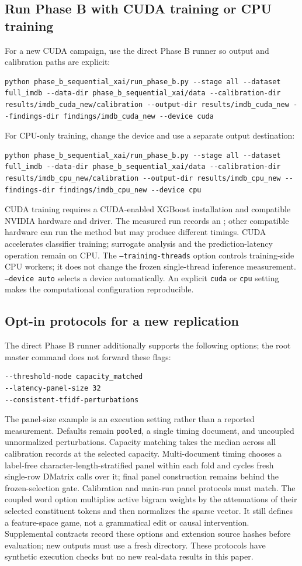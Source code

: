 \documentclass[12pt,a4paper]{article}
\begin{document}
\subsection{Run Phase B with CUDA training or CPU training}
For a new CUDA campaign, use the direct Phase B runner so output and calibration paths are explicit:
\begin{lstlisting}
python phase_b_sequential_xai/run_phase_b.py --stage all --dataset full_imdb --data-dir phase_b_sequential_xai/data --calibration-dir results/imdb_cuda_new/calibration --output-dir results/imdb_cuda_new --findings-dir findings/imdb_cuda_new --device cuda
\end{lstlisting}
For CPU-only training, change the device and use a separate output destination:
\begin{lstlisting}
python phase_b_sequential_xai/run_phase_b.py --stage all --dataset full_imdb --data-dir phase_b_sequential_xai/data --calibration-dir results/imdb_cpu_new/calibration --output-dir results/imdb_cpu_new --findings-dir findings/imdb_cpu_new --device cpu
\end{lstlisting}
CUDA training requires a CUDA-enabled XGBoost installation and compatible NVIDIA hardware and driver. The measured run records an \AcceleratorName{}; other compatible hardware can run the method but may produce different timings. CUDA accelerates classifier training; surrogate analysis and the prediction-latency operation remain on CPU.
The \texttt{--training-threads} option controls training-side CPU workers; it does not change the frozen single-thread inference measurement. \texttt{--device auto} selects a device automatically. An explicit \texttt{cuda} or \texttt{cpu} setting makes the computational configuration reproducible.
\subsection{Opt-in protocols for a new replication}
The direct Phase B runner additionally supports the following options; the root master command does not forward these flags:
\begin{lstlisting}
--threshold-mode capacity_matched
--latency-panel-size 32
--consistent-tfidf-perturbations
\end{lstlisting}
The panel-size example is an execution setting rather than a reported measurement. Defaults remain \texttt{pooled}, a single timing document, and uncoupled unnormalized perturbations. Capacity matching takes the median across all calibration records at the selected capacity. Multi-document timing chooses a label-free character-length-stratified panel within each fold and cycles fresh single-row DMatrix calls over it; final panel construction remains behind the frozen-selection gate. Calibration and main-run panel protocols must match.
The coupled word option multiplies active bigram weights by the attenuations of their selected constituent tokens and then normalizes the sparse vector. It still defines a feature-space game, not a grammatical edit or causal intervention. Supplemental contracts record these options and extension source hashes before evaluation; new outputs must use a fresh directory. These protocols have synthetic execution checks but no new real-data results in this paper.
\end{document}
